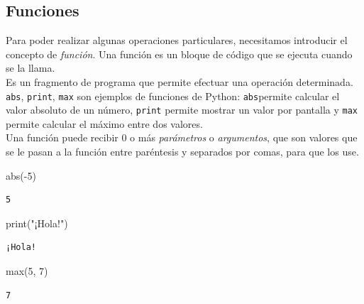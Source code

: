\documentclass[
  letterpaper,
  DIV=11,
  numbers=noendperiod]{scrreprt}
\newenvironment{Shaded}{\begin{snugshade}}{\end{snugshade}}
\newcommand{\BuiltInTok}[1]{\textcolor[rgb]{0.00,0.23,0.31}{#1}}
\newcommand{\DecValTok}[1]{\textcolor[rgb]{0.68,0.00,0.00}{#1}}
\newcommand{\NormalTok}[1]{\textcolor[rgb]{0.00,0.23,0.31}{#1}}
\newcommand{\OperatorTok}[1]{\textcolor[rgb]{0.37,0.37,0.37}{#1}}
\newcommand{\StringTok}[1]{\textcolor[rgb]{0.13,0.47,0.30}{#1}}
\begin{document}
\subsection{Funciones}\label{funciones}

Para poder realizar algunas operaciones particulares, necesitamos
introducir el concepto de \emph{función}. Una función es un bloque de
código que se ejecuta cuando se la llama.\\
Es un fragmento de programa que permite efectuar una operación
determinada. \texttt{abs}, \texttt{print}, \texttt{max} son ejemplos de
funciones de Python: \texttt{abs}permite calcular el valor absoluto de
un número, \texttt{print} permite mostrar un valor por pantalla y
\texttt{max} permite calcular el máximo entre dos valores.\\

Una función puede recibir 0 o más \emph{parámetros} o \emph{argumentos},
que son valores que se le pasan a la función entre paréntesis y
separados por comas, para que los use.\\

\begin{Shaded}
\begin{Highlighting}[]
\BuiltInTok{abs}\NormalTok{(}\OperatorTok{{-}}\DecValTok{5}\NormalTok{)}
\end{Highlighting}
\end{Shaded}

\begin{verbatim}
5
\end{verbatim}

\begin{Shaded}
\begin{Highlighting}[]
\BuiltInTok{print}\NormalTok{(}\StringTok{"¡Hola!"}\NormalTok{)}
\end{Highlighting}
\end{Shaded}

\begin{verbatim}
¡Hola!
\end{verbatim}

\begin{Shaded}
\begin{Highlighting}[]
\BuiltInTok{max}\NormalTok{(}\DecValTok{5}\NormalTok{, }\DecValTok{7}\NormalTok{)}
\end{Highlighting}
\end{Shaded}

\begin{verbatim}
7
\end{verbatim}
\end{document}
